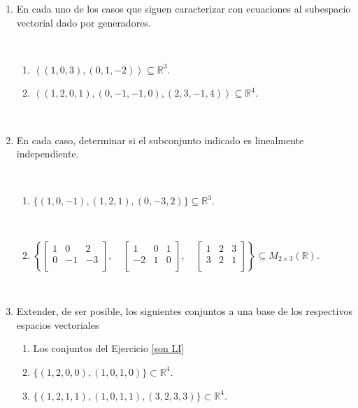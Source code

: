 \documentclass[12pt]{amsart}
\begin{document}
\begin{enumerate}
\

\item\label{(5)}  En cada uno de los casos que siguen caracterizar con ecuaciones al subespacio vectorial dado por generadores.
    
    \
    
\begin{enumerate}
\item ${\left\langle(1,0,3),(0,1,-2)\right\rangle}\subseteq \mathbb{R}^3$.
\item ${\left\langle(1,2,0,1),(0,-1,-1,0),(2,3,-1,4)\right\rangle}\subseteq \mathbb{R}^4$.
\end{enumerate}

\

\item\label{son LI} En cada caso, determinar si el subconjunto indicado es linealmente independiente.

\

\begin{enumerate}
	\item $\{ (1,0,-1), (1,2,1), (0,-3,2) \}\subseteq \mathbb{R}^3$.
	
	\
	
	\item $\left\{  \begin{bmatrix} 1 & 0 & 2 \\ 0 & -1 & -3 \\ \end{bmatrix}, \quad
	\begin{bmatrix} 1 & 0 & 1 \\ -2 & 1 & 0 \\ \end{bmatrix}, \quad
	\begin{bmatrix} 1 & 2 & 3 \\ 3 & 2 & 1 \\ \end{bmatrix} \right\}\subseteq M_{2\times 3}(\mathbb{R})$.
\end{enumerate}

\

\item Extender, de ser posible, los siguientes conjuntos a una base de los respectivos espacios vectoriales

\begin{enumerate}
	\item Los conjuntos del Ejercicio \eqref{son LI}
	\item $\{ (1,2,0,0),(1,0,1,0) \}\subset\mathbb{R}^4$.
	\item $\{ (1,2,1,1),(1,0,1,1),(3,2,3,3)\}\subset\mathbb{R}^4$.
\end{enumerate}


\end{enumerate}
\end{document}
